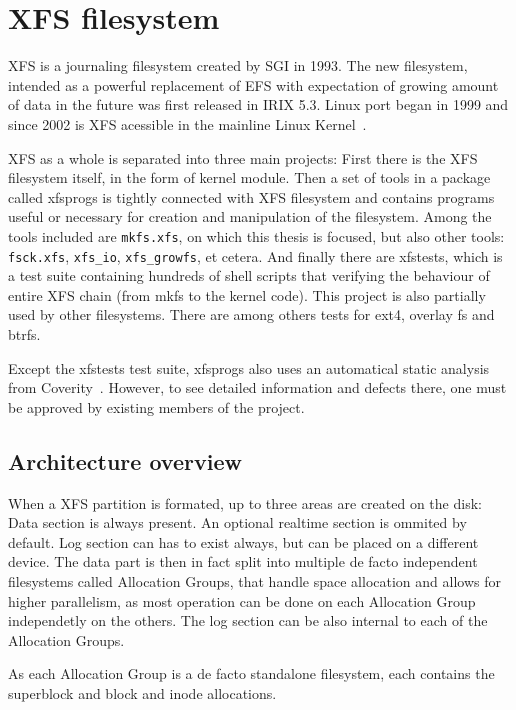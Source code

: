 
\chapter{XFS filesystem} \label{chap:xfs}

XFS is a journaling filesystem created by SGI in 1993. The new filesystem, intended as a powerful replacement of EFS with expectation of growing amount of data in the future was first released in IRIX 5.3. Linux port began in 1999 and since 2002 is XFS acessible in the mainline Linux Kernel~\cite[Chap. 1.2, 1.3]{xfsHistory}.

XFS as a whole is separated into three main projects: First there is the XFS filesystem itself, in the form of kernel module. Then a set of tools in a package called xfsprogs is tightly connected with XFS filesystem and contains programs useful or necessary for creation and manipulation of the filesystem. Among the tools included are {\tt mkfs.xfs}, on which this thesis is focused, but also other tools: {\tt fsck.xfs}, {\tt xfs\_io}, {\tt xfs\_growfs}, et cetera. And finally there are xfstests, which is a test suite containing hundreds of shell scripts that verifying the behaviour of entire XFS chain (from mkfs to the kernel code). This project is also partially used by other filesystems. There are among others tests for ext4, overlay fs and btrfs.

Except the xfstests test suite, xfsprogs also uses an automatical static analysis from Coverity~\cite{CoverityXfsprogs}. However, to see detailed information and defects there, one must be approved by existing members of the project.


\section{Architecture overview}\label{chap:xfs:overview}

When a XFS partition is formated, up to three areas are created on the disk: Data section is always present. An optional realtime section is ommited by default. Log section can has to exist always, but can be placed on a different device. The data part is then in fact split into multiple de facto independent filesystems called Allocation Groups, that handle space allocation and allows for higher parallelism, as most operation can be done on each Allocation Group independetly on the others. The log section can be also internal to each of the Allocation Groups.

As each Allocation Group is a de facto standalone filesystem, each contains the superblock and block and inode allocations.

